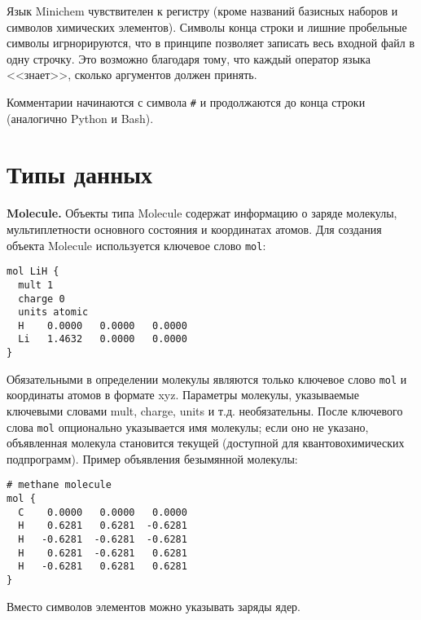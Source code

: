 \documentclass[a4paper]{book}
\begin{document}
Язык Minichem чувствителен к регистру (кроме названий базисных наборов и символов химических элементов). Символы конца строки и лишние пробельные символы
игрнорируются, что в принципе позволяет записать весь входной файл в одну строчку. Это возможно благодаря тому, что каждый оператор языка <<знает>>, сколько
аргументов должен принять.

Комментарии начинаются с символа \texttt{\#} и продолжаются до конца строки (аналогично Python и Bash).

\section{Типы данных}
\textbf{Molecule.} Объекты типа Molecule содержат информацию о заряде молекулы, мультиплетности основного состояния и координатах атомов.
Для создания объекта Molecule используется ключевое слово \texttt{mol}:
\begin{lstlisting}
mol LiH {
  mult 1
  charge 0
  units atomic
  H    0.0000   0.0000   0.0000
  Li   1.4632   0.0000   0.0000
}
\end{lstlisting}
Обязательными в определении молекулы являются только ключевое слово \texttt{mol} и координаты атомов в формате xyz.
Параметры молекулы, указываемые ключевыми словами mult, charge, units и т.д. необязательны.
После ключевого слова \texttt{mol} опционально указывается имя молекулы; если оно не указано, объявленная
молекула становится текущей (доступной для квантовохимических подпрограмм). Пример объявления безымянной молекулы:
\begin{lstlisting}
# methane molecule
mol {
  C    0.0000   0.0000   0.0000
  H    0.6281   0.6281  -0.6281
  H   -0.6281  -0.6281  -0.6281
  H    0.6281  -0.6281   0.6281
  H   -0.6281   0.6281   0.6281
}
\end{lstlisting}

Вместо символов элементов можно указывать заряды ядер.
\end{document}
